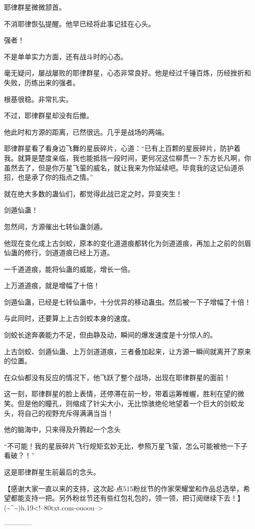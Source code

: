 \begin{this_body}
耶律群星微微颔首。

不消耶律恢弘提醒。他早已经将此事记挂在心头。

强者！

不是单单实力方面，还有战斗时的心态。

毫无疑问，屡战屡败的耶律群星，心态非常良好。他是经过千锤百炼，历经挫折和失败，历练出来的强者。

根基很稳。非常扎实。

不过，耶律群星却没有后撤。

他此时和方源的距离，已然很远。几乎是战场的两端。

耶律群星看了看身边飞舞的星辰碎片，心道：“已有上百颗的星辰碎片，防护着我。就算是楚度亲临，我也能抵挡一段时间，更何况这位柳贯一？东方长凡啊，你虽然去了，但是你万星飞萤的威名，就让我来为你延续吧。毕竟我的这记仙道杀招，也是承了你的指点之情。”

就在绝大多数的蛊仙们，都觉得此战已定之时，异变突生！

剑遁仙蛊！

忽然间，方源催出七转仙蛊剑遁。

他现在变化成上古剑蛟，原本的变化道道痕都转化为剑道道痕，再加上之前的剑眉仙蛊的修行，剑道道痕已经上万道。

一千道道痕，能将仙蛊的威能，增长一倍。

上万道道痕，就是增幅了十倍！

剑遁仙蛊，已经是七转仙蛊中，十分优异的移动蛊虫。然后被一下子增幅了十倍！

与此同时，还要算上上古剑蛟本身的速度。

剑蛟长途奔袭能力不足，但由静及动，瞬间的爆发速度是十分惊人的。

上古剑蛟、剑遁仙蛊、上万剑道道痕，三者叠加起来，让方源一瞬间就离开了原来的位置。

在众仙都没有反应的情况下，他飞跃了整个战场，出现在耶律群星的面前！

这一刻，耶律群星的脸上表情，还停滞在前一秒，带着运筹帷幄，胜利在望的微笑。但是他的瞳孔，则缩成了针尖大小，无比惊骇绝伦地望着一个巨大的剑蛟龙头，将自己的视野充斥得满满当当！

他的脑海中，只来得及升腾起一个念头

“不可能！我的星辰碎片飞行规矩玄妙无比，参照万星飞萤，怎么可能被他一下子看破？！”

这是耶律群星生前最后的念头。

【感谢大家一直以来的支持，这次起-点515粉丝节的作家荣耀堂和作品总选举，希望都能支持一把。另外粉丝节还有些红包礼包的，领一领，把订阅继续下去！】(\~{}\^{}\~{})h.19<!--80txt.com-ouoou-->

------------

\end{this_body}

